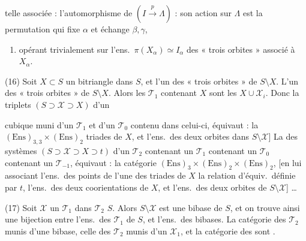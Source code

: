 \documentclass[11pt,a4paper]{article}
\begin{document}
telle associée : l'automorphisme de
$(I \xrightarrow{p} \Lambda)$ : son action sur $\Lambda$ est la
permutation qui fixe $\alpha$ et échange $\beta, \gamma$,
\ill{}
\begin{enumerate}
\item[b)] opérant trivialement sur l'ens.\ $\pi(X_\alpha) \simeq I_\alpha$
des « trois orbites » associé à $X_\alpha$.
\end{enumerate}

(16) Soit $X \subset S$ un bitriangle dans $S$, et
\uncertain{\ill{}} l'un des « trois orbites » de $S \setminus X$.
  L'un des « trois orbites » de $S\setminus X$.
Alors les   $\mathcal{T}_1$ \struck{\ill{}} contenant
$X$ sont les $X \cup \mathcal{X}_i$. Donc la  \struck{\ill{}}
 triplets $(S \supset \mathcal{X} \supset X)$ d'un  \struck{\ill{}}

cubique  muni d'un $\mathcal{T}_1$ et d'un $\mathcal{T}_0$ contenu
dans celui-ci, équivaut : la  \struck{\ill{}}
 $(\mathrm{Ens})_{3,3} \times (\mathrm{Ens})_2$ \struck{[en associant l'ens.\ des \ill{}} 
\struck{ens.\ à trois éléments],}
triades de $X$, et l'ens.\ des deux orbites dans $S \setminus \mathcal{X}$]
 La  \struck{\ill{}} des systèmes
$(S \supset \mathcal{X} \supset X \supset t)$ d'un $\mathcal{T}_2$ contenant un $\mathcal{T}_1$ contenant un
$\mathcal{T}_0$ contenant un $\mathcal{T}_{-1}$, équivaut : la catégorie
$(\mathrm{Ens})_3 \times (\mathrm{Ens})_2 \times (\mathrm{Ens})_2$, [en lui associant l'ens.\
des points de l'une des triades de  $X$  la
relation d'équiv.\ définie par $t$, l'ens.\ des
deux coorientations de $X$, et l'ens.\ des deux
orbites de $S \setminus \mathcal{X}$] …

(17) Soit $\mathcal{X}$ un $\mathcal{T}_1$ dans  $\mathcal{T}_2$ $S$. Alors
$S \setminus \mathcal{X}$ est une bibase de $S$, et on trouve
ainsi une bijection entre l'ens.\ des
$\mathcal{T}_1$ de $S$, et l'ens.\ des bibases. La
catégorie des $\mathcal{T}_2$ munis d'une bibase, celle des
$\mathcal{T}_2$ munis d'un $\mathcal{X}_1$, et la catégorie des
\ill{} \ill{} sont .
\end{document}
